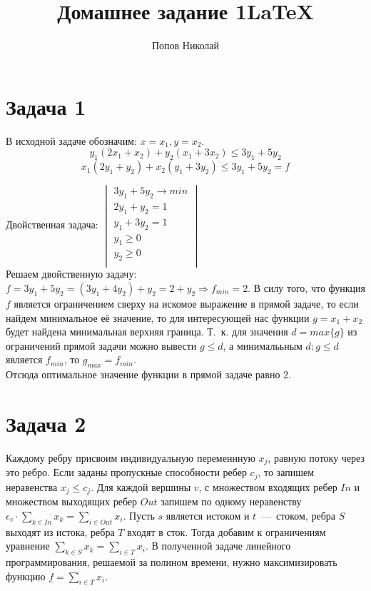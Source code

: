 \documentclass[a4paper,12pt]{article} %
\author{Попов Николай}
\title{Домашнее задание 1\LaTeX{}}
\begin{document}
\section*{Задача 1}
В исходной задаче обозначим: $x = x_1, y = x_2$. \\
\[
y_1(2x_1+x_2)+y_2(x_1+3x_2)\leq 3y_1+5y_2
\]
\[
x_1(2y_1+y_2)+x_2(y_1+3y_2)\leq 3y_1+5y_2 = f
\]

Двойственная задача:
$
\begin{vmatrix}
3y_1 + 5y_2 \rightarrow min\\
2y_1+y_2=1\\
y_1+3y_2=1\\
y_1 \geq 0\\
y_2 \geq 0\\
\end{vmatrix}
$\\

Решаем двойственную задачу:
$f= 3y_1 + 5y_2 = (3y_1 + 4y_2)+y_2 = 2 +y_2 \Rightarrow f_{min}=2$.
В силу того, что функция $f$ является ограничением сверху на искомое выражение в прямой задаче, то если найдем минимальное её значение, то для интересующей нас функции $g=x_1+x_2$ будет найдена минимальная верхняя граница. Т.~к. для значения $d = max\{g\}$ из ограничений прямой задачи можно вывести $g \leq d$, а минималььным $d : g \leq d$ является $f_{min}$, то $g_{max}=f_{min}$.\\
Отсюда оптимальное значение функции в прямой задаче равно $2$.\\

\section*{Задача 2}
Каждому ребру присвоим индивидуальную переменнную $x_j$, равную потоку через это ребро. Если заданы пропускные способности ребер $c_j$, то запишем неравенства $x_j\leq c_j$. Для каждой вершины $v$, с  множеством входящих ребер $In$ и множеством выходящих ребер $Out$ запишем по одному неравенству $\epsilon_v\cdot\sum_{k \in In}{x_k}= \sum_{i \in Out}{x_i}$. Пусть $s$ является истоком и $t$~---~стоком, ребра $S$ выходят из истока, ребра $T$ входят в сток. Тогда добавим к ограничениям уравнение $\sum_{k \in S}{x_k}=\sum_{i \in T}{x_i}$. В полученной задаче линейного программирования, решаемой за полином времени, нужно максимизировать функцию   $f = \sum_{i \in T}{x_i}$. \\
\end{document}
